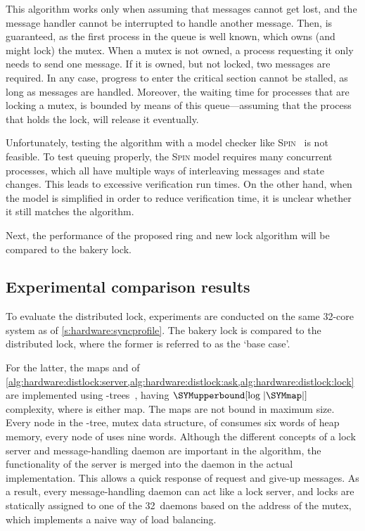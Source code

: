 This algorithm works only when assuming that messages cannot get lost, and the message handler cannot be interrupted to handle another message.
Then,  is guaranteed, as the first process in the queue is well known, which owns (and might lock) the mutex.
When a mutex is not owned, a process requesting it only needs to send one message.
If it is owned, but not locked, two messages are required.
In any case, progress to enter the critical section cannot be stalled, as long as messages are handled.
Moreover, the waiting time for processes that are locking a mutex, is bounded by means of this queue---assuming that the process that holds the lock, will release it eventually.

Unfortunately, testing the algorithm with a model checker like \textsc{Spin}~\cite{holzmann:spin} is not feasible.
To test queuing properly, the \textsc{Spin} model requires many concurrent processes, which all have multiple ways of interleaving messages and state changes.
This leads to excessive verification run times.
On the other hand, when the model is simplified in order to reduce verification time, it is unclear whether it still matches the algorithm.

Next, the performance of the proposed ring and new lock algorithm will be compared to the bakery lock.

\subsection{Experimental comparison results}
\label{s:hardware:distlock:experiments}

To evaluate the distributed lock, experiments are conducted on the same 32-core system as of \cref{s:hardware:syncprofile}.
The bakery lock is compared to the distributed lock, where the former is referred to as the `base case'.

For the latter, the maps \SYMservermap and \SYMlockset[\SYMproc] of \cref{alg:hardware:distlock:server,alg:hardware:distlock:ask,alg:hardware:distlock:lock} are implemented using -trees~\cite{andersson:aa_tree}, having $\SYMupperbound[\log\;\lvert\SYMmap\rvert]$ complexity, where \SYMmap is either map.
The maps are not bound in maximum size.
Every node in the -tree, \ie mutex data structure, of \SYMservermap consumes six words of heap memory, every node of \SYMlockset[\SYMproc] uses nine words.
Although the different concepts of a lock server and message-handling daemon are important in the algorithm, the functionality of the server is merged into the daemon in the actual implementation.
This allows a quick response of request and give-up messages.
As a result, every message-handling daemon can act like a lock server, and locks are statically assigned to one of the 32~daemons based on the address of the mutex, which implements a naive way of load balancing.


